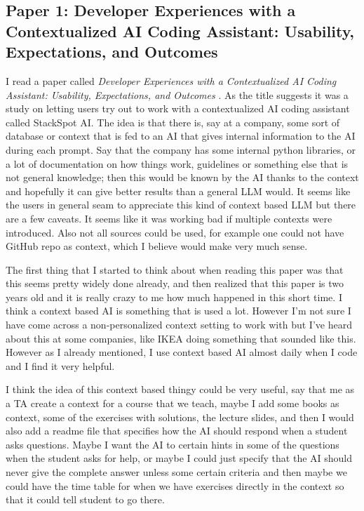 \documentclass[11pt]{article}
\begin{document}
\subsection{Paper 1: Developer Experiences with a Contextualized {AI} Coding Assistant: Usability, Expectations, and Outcomes}
I read a paper called \textit{Developer Experiences with a Contextualized {AI} Coding Assistant: Usability, Expectations, and Outcomes} \cite{pinto_developer_2024}. As the title suggests it was a study on letting users try out to work with a contextualized AI coding assistant called StackSpot AI. The idea is that there is, say at a company, some sort of database or context that is fed to an AI that gives internal information to the AI during each prompt. Say that the company has some internal python libraries, or a lot of documentation on how things work, guidelines or something else that is not general knowledge; then this would be known by the AI thanks to the context and hopefully it can give better results than a general LLM would. It seems like the users in general seam to appreciate this kind of context based LLM but there are a few caveats. It seems like it was working bad if multiple contexts were introduced. Also not all sources could be used, for example one could not have GitHub repo as context, which I believe would make very much sense.

The first thing that I started to think about when reading this paper was that this seems pretty widely done already, and then realized that this paper is two years old and it is really crazy to me how much happened in this short time. I think a context based AI is something that is used a lot. However I'm not sure I have come across a non-personalized context setting to work with but I've heard about this at some companies, like IKEA doing something that sounded like this. However as I already mentioned, I use context based AI almost daily when I code and I find it very helpful. 

I think the idea of this context based thingy could be very useful, say that me as a TA create a context for a course that we teach, maybe I add some books as context, some of the exercises with solutions, the lecture slides, and then I would also add a readme file that specifies how the AI should respond when a student asks questions. Maybe I want the AI to certain hints in some of the questions when the student asks for help, or maybe I could just specify that the AI should never give the complete answer unless some certain criteria and then maybe we could have the time table for when we have exercises directly in the context so that it could tell student to go there. 
\end{document}
